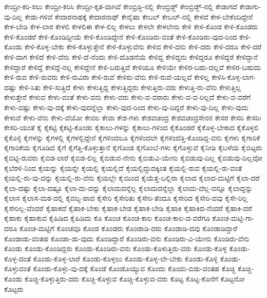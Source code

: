 {ಕೇಂದ್ರೀ-ಕರಿ-ಸಲು
ಕೇಂದ್ರೀ-ಕರಿಸಿ
ಕೇಂದ್ರೀ-ಕೃತ-ವಾಗಿವೆ
ಕೇಂಬ್ರಿಡ್ಜಿ-ನಲ್ಲಿ
ಕೇಂಬ್ರಿಡ್ಜ್
ಕೇಂಬ್ರಿಡ್ಜ್-ನಲ್ಲಿ
ಕೇಡಾಗದೆ
ಕೇಡಾಗು-ವು-ದಿಲ್ಲ
ಕೇಡು-ಗಳಿವೆ
ಕೇದಾರನಾಥಕ್ಕೆ
ಕೇದಾರನಾಥ್
ಕೇನೈಷಾ
ಕೇಬಲ್
ಕೇಬಲ್-ನಲ್ಲಿ
ಕೇಳದೆ
ಕೇಳ-ಬೇಕೆಂದಿದ್ದೇನೆ
ಕೇಳ-ಬೇಡಿ
ಕೇಳ-ಲಾರ
ಕೇಳಲಿ
ಕೇಳಲಿಈ
ಕೇಳ-ಲಿಲ್ಲ
ಕೇಳಲು
ಕೇಳಲೇ
ಕೇಳಲೇನು
ಕೇಳಿ
ಕೇಳಿ-ಕೊಂಡ
ಕೇಳಿ-ಕೊಂಡರು
ಕೇಳಿ-ಕೊಂಡರೆ
ಕೇಳಿ-ಕೊಂಡಿದ್ದೀಯೆ
ಕೇಳಿ-ಕೊಂಡಿದ್ದೇನೆ
ಕೇಳಿ-ಕೊಂಡಿರು-ವಂತೆ
ಕೇಳಿ-ಕೊಂಡಿರು-ವುದ-ರಿಂದ
ಕೇಳಿ-ಕೊಂಡು
ಕೇಳಿ-ಕೊಳ್ಳ-ಬೇಕು
ಕೇಳಿ-ಕೊಳ್ಳುತ್ತೇನೆ
ಕೇಳಿ-ಕೊಳ್ಳುವೆನು
ಕೇಳಿದ
ಕೇಳಿ-ದನು
ಕೇಳಿ-ದರು
ಕೇಳಿ-ದರೂ
ಕೇಳಿ-ದರೆ
ಕೇಳಿ-ದಾಗ
ಕೇಳಿದೆ
ಕೇಳಿ-ದೆನು
ಕೇಳಿ-ದೆ-ನೆಂದು
ಕೇಳಿ-ದೊಡನೆಯೆ
ಕೇಳಿದ್ದ
ಕೇಳಿದ್ದನು
ಕೇಳಿದ್ದರೂ
ಕೇಳಿದ್ದರೆ
ಕೇಳಿದ್ದಾನೆ
ಕೇಳಿದ್ದಾರೆ
ಕೇಳಿದ್ದೆ
ಕೇಳಿದ್ದೆ-ನಲ್ಲ
ಕೇಳಿದ್ದೇನೆ
ಕೇಳಿ-ಬರುತ್ತಿವೆ
ಕೇಳಿಯೂ
ಕೇಳಿಯೇ
ಕೇಳಿರ-ಬಹು-ದಲ್ಲವೆ
ಕೇಳಿರ-ಬಹುದು
ಕೇಳಿ-ರುವ
ಕೇಳಿ-ರುವರು
ಕೇಳಿ-ರುವಿರಾ
ಕೇಳಿ-ರುವೆ
ಕೇಳಿರು-ವೆನು
ಕೇಳಿ-ರುವೆ-ಯಲ್ಲವೆ
ಕೇಳಿಲ್ಲ
ಕೇಳಿಸಿ-ಕೊಳ್ಳ-ಲಾಗ-ದಷ್ಟು
ಕೇಳಿ-ಸಿತು
ಕೇಳಿ-ಸುತ್ತಿದೆ
ಕೇಳು
ಕೇಳುತ್ತಿದ್ದ
ಕೇಳುತ್ತಿದ್ದರು
ಕೇಳುತ್ತಿರು-ವರು
ಕೇಳುತ್ತಿ-ರು-ವೆನು
ಕೇಳುತ್ತಿಲ್ಲ
ಕೇಳುತ್ತೇನೆ
ಕೇಳುವ
ಕೇಳು-ವಂತೆ
ಕೇಳು-ವನು
ಕೇಳು-ವರು
ಕೇಳು-ವ-ವರಾರು
ಕೇಳು-ವ-ವ-ರಿಲ್ಲದೆ
ಕೇಳು-ವ-ವರೆಗೆ
ಕೇಳು-ವಷ್ಟು
ಕೇಳು-ವು-ದಕ್ಕೆ
ಕೇಳು-ವುದನ್ನೆಲ್ಲಾ
ಕೇಳು-ವುದ-ರಿಂದ
ಕೇಳು-ವು-ದಿದ್ದರೆ
ಕೇಳು-ವು-ದಿಲ್ಲ
ಕೇಳು-ವುದು
ಕೇಳುವೆ
ಕೇಳು-ವೆನು
ಕೇಳು-ವೆಯೋ
ಕೇವಲ
ಕೇವಾ
ಕೇಶ-ಗಳು
ಕೇಶವಚಂದ್ರ
ಕೇಶವಚಂದ್ರಸೇನನ
ಕೇಸರ
ಕೇಸರಿ
ಕೇಸರಿಃ
ಕೇಸರಿ-ಯಂತೆ
ಕೈ
ಕೈಕಟ್ಟಿ
ಕೈಕಟ್ಟಿ-ಕೊಂಡು
ಕೈಕಾಲು-ಗಳನ್ನು
ಕೈಕಾಲು-ಗಳಿಂದ
ಕೈಕೊಂಡರೆ
ಕೈಕೊಳ್ಳ-ಬೇಕಾದ
ಕೈಕೊಳ್ಳಲಿ
ಕೈಕೊಳ್ಳಿ
ಕೈಗಳನ್ನು
ಕೈಗಳಲ್ಲಿ
ಕೈಗಳಲ್ಲಿದ್ದೇನೆ
ಕೈಗಳಿಂದಲೂ
ಕೈಗಳಿಂದಲೇ
ಕೈಗಳಿಂದೆತ್ತಿ-ಕೊಂಡಿದ್ದ-ವನು
ಕೈಗಳು
ಕೈಗಾರಿಕೆ
ಕೈಗಾರಿಕೆಯ
ಕೈಗೂಡಿದ
ಕೈಗೆ
ಕೈಗೆತ್ತಿ-ಕೊಳ್ಳುತ್ತಾನೆ
ಕೈಗೊಂಡ
ಕೈಗೊಂಬೆ-ಗಳು
ಕೈಗೊಳ್ಳುವೆ
ಕೈನೀಡಿ
ಕೈಬಳೆಯ
ಕೈಬಿಟ್ಟರು
ಕೈಬಿಟ್ಟಿ-ರುವರು
ಕೈಬಿಡ-ಲಾರೆ
ಕೈಬಿಡ-ಲಿಲ್ಲ
ಕೈಬಿಡುವ-ನೇನು
ಕೈಬಿಡುವಿ-ಯೇನು
ಕೈಬಿಡುವು-ದಿಲ್ಲ
ಕೈಬಿಡುವು-ದಿಲ್ಲವೋ
ಕೈಬೆರಳಿ-ನಿಂದ
ಕೈಯನ್ನು
ಕೈಯನ್ನೇ
ಕೈಯಲ್ಲಿ
ಕೈಯಲ್ಲಿದೆ
ಕೈಯಲ್ಲಿದ್ದುದಕ್ಕಿಂತ
ಕೈಯಲ್ಲಿ-ರುವ
ಕೈಯಲ್ಲಿ-ರು-ವಂತೆ
ಕೈಯಲ್ಲಿ-ರು-ವು-ದನ್ನು
ಕೈಯಲ್ಲಿ-ರು-ವೆನು
ಕೈಯಲ್ಲೇ
ಕೈಯಿಂದ
ಕೈಯೆತ್ತ-ಬಲ್ಲಿರಾ
ಕೈಲಾದ
ಕೈಲಾದ-ಮಟ್ಟಿಗೆ
ಕೈಲಾ-ದರೆ
ಕೈಲಾ-ದಷ್ಟು
ಕೈಲಾ-ದಷ್ಟೂ
ಕೈಲಾ-ದು-ದನ್ನು
ಕೈಲಾದುದನ್ನೆಲ್ಲ
ಕೈಲಾದುದನ್ನೆಲ್ಲಾ
ಕೈಲಾದು-ದೆಲ್ಲ-ವನ್ನೂ
ಕೈಲಾದ್ದನ್ನು
ಕೈಲಾಸ
ಕೈಲಾಸ-ಮಠ-ದಲ್ಲಿ
ಕೈವಲ್ಯ-ಪಾದ
ಕೈಸೇರಿ
ಕೈಸೇರಿತು
ಕೈಸೇರಿ-ತೆಂದೂ
ಕೈಸೇರಿದ
ಕೈಸೇರಿ-ದವು
ಕೈಸೇ-ರಿಲ್ಲ
ಕೈಸೇರಿಲ್ಲ-ವೆಂದರೆ
ಕೈಹಾಕದೆ
ಕೈಹಾಕ-ಬೇಕು
ಕೈಹಾಕ-ಬೇಡ
ಕೈಹಾಕ-ಬೇಡಿ
ಕೈಹಾಕಿ
ಕೈಹಾಕಿದ-ನೆಂದರೆ
ಕೈಹಾಕಿ-ದರೆ
ಕೈಹಾಕು
ಕೈಹಾಕುವ
ಕೈಹಿಡಿದ
ಕೈಹಿಡಿದು
ಕೊ
ಕೊಂಚ
ಕೊಂಚ-ಕಾಲ
ಕೊಂಚ-ಕಾಲ-ದ-ವರೆಗೂ
ಕೊಂಚ-ಮಟ್ಟಿ-ಗಾ-ದರೂ
ಕೊಂಚ-ಮಟ್ಟಿಗೆ
ಕೊಂಚವೂ
ಕೊಂಡ
ಕೊಂಡರು
ಕೊಂಡಾಡಿ-ದರು
ಕೊಂಡಾಡಿ-ದವು
ಕೊಂಡಾಡಿದ್ದಾರೆ
ಕೊಂಡಾಡು-ವಂತಹ
ಕೊಂಡಾ-ಡು-ವುದು
ಕೊಂಡಿದ್ದಾರೆ
ಕೊಂಡಿರು-ವನು
ಕೊಂಡಿರು-ವಿ-ಯೇನು
ಕೊಂಡಿರು-ವೆನು
ಕೊಂಡು
ಕೊಂಡು-ಕೊಂಡಿದ್ದರು
ಕೊಂಡು-ಕೊಂಡಿರು-ವನು
ಕೊಂಡು-ಕೊಳುತ್ತಿರು-ವರು
ಕೊಂಡು-ಕೊಳ್ಳ
ಕೊಂಡು-ಕೊಳ್ಳ-ದಂತೆ
ಕೊಂಡು-ಕೊಳ್ಳ-ಲಾರೆ
ಕೊಂಡು-ಕೊಳ್ಳಲು
ಕೊಂಡು-ಕೊಳ್ಳ-ಲೇ-ಬೇಕು
ಕೊಂಡು-ಕೊಳ್ಳಿ
ಕೊಂಡು-ಕೊಳ್ಳುವಂತೆ
ಕೊಂಡು-ಕೊಳ್ಳು-ವು-ದಕ್ಕೆ
ಕೊಂಡೆ
ಕೊಂಡೊಯ್ಯುವ
ಕೊಂದು
ಕೊಂದು-ಬಿಡು-ವಂತಹ
ಕೊಚ್ಚಿ
ಕೊಚ್ಚಿ-ಕೊಂಡು
ಕೊಚ್ಚಿ-ಕೊಳ್ಳುತ್ತಿರು-ವರು
ಕೊಚ್ಚಿ-ಕೊಳ್ಳುವ
ಕೊಚ್ಚಿ-ಕೊಳ್ಳುವ-ವರು
ಕೊಟ್ಟ
ಕೊಟ್ಟ-ಕೊನೆಗೆ
ಕೊಟ್ಟನೋ
ಕೊಟ್ಟರು
}
